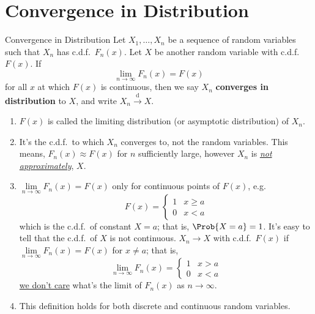 \section{Convergence in Distribution}
\begin{Definition}{Convergence in Distribution}{}
    Let $ X_1,\ldots,X_n $ be a sequence of random variables
    such that $ X_n $ has c.d.f.\ $ F_n(x) $. Let $ X $
    be another random variable with c.d.f.\ $ F(x) $.
    If
    \[ \lim\limits_{{n} \to {\infty}} F_n(x)=F(x) \]
    for all $ x $ at which $ F(x) $ is continuous, then
    we say $ X_n $ \textbf{converges in distribution}
    to $ X $, and write $ X_n\stackrel{\text{d}}{\to} X $.
\end{Definition}
\begin{Remark}{}{}
    \begin{enumerate}[label=(\roman*)]
        \item $ F(x) $ is called the limiting distribution
              (or asymptotic distribution) of $ X_n $.
        \item It's the c.d.f.\ to which $ X_n $ converges to,
              not the random variables. This means,
              $ F_n(x)\approx F(x) $ for $ n $ sufficiently large,
              however $ X_n $ is \underline{\emph{not approximately}},
              $ X $.
        \item $ \lim\limits_{{n} \to {\infty}} F_n(x)=F(x) $
              only for continuous points of $ F(x) $, e.g.\
              \[ F(x)=\begin{cases}
                      1 & x\ge a \\
                      0 & x<a
                  \end{cases} \]
              which is the c.d.f.\
              of constant $ X=a $; that is,
              $ \Prob{X=a}=1 $. It's easy to tell that the
              c.d.f.\ of $ X $ is not continuous.
              $ X_n\to X $ with c.d.f.\ $ F(x) $ if
              $ \lim\limits_{{n} \to {\infty}} F_n(x)=F(x) $
              for $ x\neq a $; that is,
              \[ \lim\limits_{{n} \to {\infty}} F_n(x)=
                  \begin{cases}
                      1 & x>a \\
                      0 & x<a
                  \end{cases} \]
              \underline{we don't care} what's the limit of
              $ F_n(x) $ as $ n\to\infty $.
        \item This definition holds for both discrete and continuous random variables.
    \end{enumerate}
\end{Remark}
